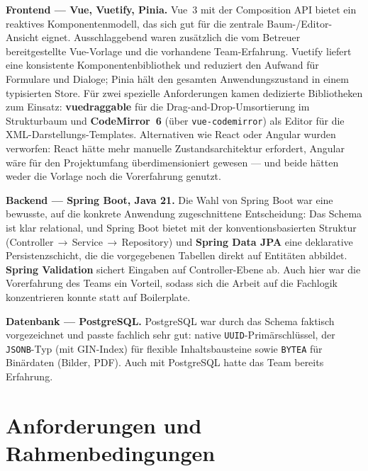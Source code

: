 \documentclass[11pt,a4paper]{article}
\begin{document}
\textbf{Frontend --- Vue, Vuetify, Pinia.} Vue~3 mit der Composition API bietet
ein reaktives Komponentenmodell, das sich gut für die zentrale Baum-/Editor-
Ansicht eignet. Ausschlaggebend waren zusätzlich die vom Betreuer bereitgestellte
Vue-Vorlage und die vorhandene Team-Erfahrung. Vuetify liefert eine konsistente
Komponentenbibliothek und reduziert den Aufwand für Formulare und Dialoge; Pinia
hält den gesamten Anwendungszustand in einem typisierten Store. Für zwei
spezielle Anforderungen kamen dedizierte Bibliotheken zum Einsatz:
\textbf{vuedraggable} für die Drag-and-Drop-Umsortierung im Strukturbaum und
\textbf{CodeMirror~6} (über \texttt{vue-codemirror}) als Editor für die
XML-Darstellungs-Templates. Alternativen wie React oder Angular wurden verworfen:
React hätte mehr manuelle Zustandsarchitektur erfordert, Angular wäre für den
Projektumfang überdimensioniert gewesen --- und beide hätten weder die Vorlage
noch die Vorerfahrung genutzt.

\textbf{Backend --- Spring Boot, Java 21.} Die Wahl von Spring Boot war eine
bewusste, auf die konkrete Anwendung zugeschnittene Entscheidung: Das Schema ist
klar relational, und Spring Boot bietet mit der konventionsbasierten Struktur
(Controller\,$\rightarrow$\,Service\,$\rightarrow$\,Repository) und \textbf{Spring
Data JPA} eine deklarative Persistenzschicht, die die vorgegebenen Tabellen
direkt auf Entitäten abbildet. \textbf{Spring Validation} sichert Eingaben auf
Controller-Ebene ab. Auch hier war die Vorerfahrung des Teams ein Vorteil, sodass
sich die Arbeit auf die Fachlogik konzentrieren konnte statt auf Boilerplate.

\textbf{Datenbank --- PostgreSQL.} PostgreSQL war durch das Schema faktisch
vorgezeichnet und passte fachlich sehr gut: native \texttt{UUID}-Primärschlüssel,
der \texttt{JSONB}-Typ (mit GIN-Index) für flexible Inhaltsbausteine sowie
\texttt{BYTEA} für Binärdaten (Bilder, PDF). Auch mit PostgreSQL hatte das Team
bereits Erfahrung.

\section{Anforderungen und Rahmenbedingungen}\label{sec:anf}
\end{document}
